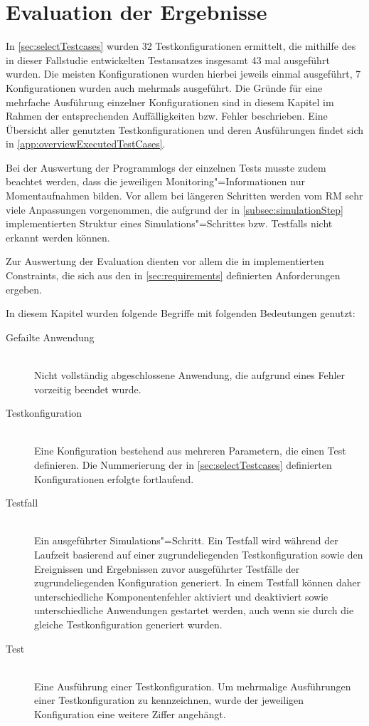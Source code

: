 \chapter{Evaluation der Ergebnisse}
\label{ch:evaluationResults}

In \autoref{sec:selectTestcases} wurden 32 Testkonfigurationen ermittelt, die mithilfe des in dieser Fallstudie entwickelten Testansatzes insgesamt 43 mal ausgeführt wurden.
Die meisten Konfigurationen wurden hierbei jeweils einmal ausgeführt, 7 Konfigurationen wurden auch mehrmals ausgeführt.
Die Gründe für eine mehrfache Ausführung einzelner Konfigurationen sind in diesem Kapitel im Rahmen der entsprechenden Auffälligkeiten bzw. Fehler beschrieben.
Eine Übersicht aller genutzten Testkonfigurationen und deren Ausführungen findet sich in \autoref{app:overviewExecutedTestCases}.

Bei der Auswertung der Programmlogs der einzelnen Tests musste zudem beachtet werden, dass die jeweiligen Monitoring"=Informationen nur Momentaufnahmen bilden.
Vor allem bei längeren Schritten werden vom \ac{RM} sehr viele Anpassungen vorgenommen, die aufgrund der in \autoref{subsec:simulationStep} implementierten Struktur eines Simulations"=Schrittes bzw. Testfalls nicht erkannt werden können.

Zur Auswertung der Evaluation dienten vor allem die in  implementierten Constraints, die sich aus den in \autoref{sec:requirements} definierten Anforderungen ergeben.

In diesem Kapitel wurden folgende Begriffe mit folgenden Bedeutungen genutzt:

\begin{description}
    \item [Gefailte Anwendung] \hfill \\
        Nicht vollständig abgeschlossene Anwendung, die aufgrund eines Fehler vorzeitig beendet wurde.
    \item [Testkonfiguration] \hfill \\
        Eine Konfiguration bestehend aus mehreren Parametern, die einen Test definieren.
        Die Nummerierung der in \autoref{sec:selectTestcases} definierten Konfigurationen erfolgte fortlaufend.
    \item [Testfall] \hfill \\
        Ein ausgeführter Simulations"=Schritt.
        Ein Testfall wird während der Laufzeit basierend auf einer zugrundeliegenden Testkonfiguration sowie den Ereignissen und Ergebnissen zuvor ausgeführter Testfälle der zugrundeliegenden Konfiguration generiert.
        In einem Testfall können daher unterschiedliche Komponentenfehler aktiviert und deaktiviert sowie unterschiedliche Anwendungen gestartet werden, auch wenn sie durch die gleiche Testkonfiguration generiert wurden.
    \item [Test] \hfill \\
        Eine Ausführung einer Testkonfiguration.
        Um mehrmalige Ausführungen einer Testkonfiguration zu kennzeichnen, wurde der jeweiligen Konfiguration eine weitere Ziffer angehängt.
\end{description}

